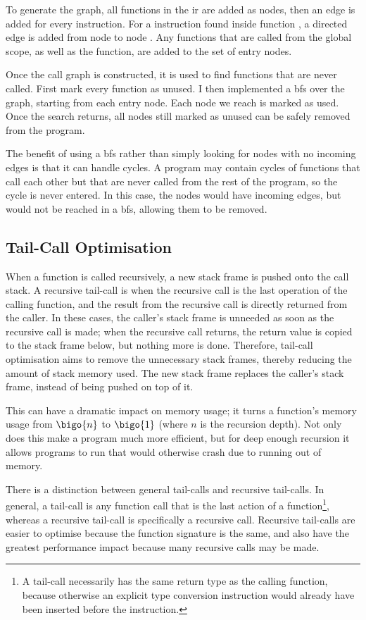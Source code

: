 \documentclass[00-main.tex]{subfiles}
\begin{document}
To generate the graph, all functions in the \gls{ir} are added as nodes, then an edge is added for every  instruction.
For a  instruction found inside function , a directed edge is added from node  to node .
Any functions that are called from the global scope, as well as the  function, are added to the set of entry nodes.

Once the call graph is constructed, it is used to find functions that are never called.
First mark every function as unused.
I then implemented a \gls{bfs} over the graph, starting from each entry node.
Each node we reach is marked as used.
Once the search returns, all nodes still marked as unused can be safely removed from the program.

The benefit of using a \gls{bfs} rather than simply looking for nodes with no incoming edges is that it can handle cycles.
A program may contain cycles of functions that call each other but that are never called from the rest of the program, so the cycle is never entered.
In this case, the nodes would have incoming edges, but would not be reached in a \gls{bfs}, allowing them to be removed.


\subsection{Tail-Call Optimisation}

When a function is called recursively, a new stack frame is pushed onto the call stack.
A recursive tail-call is when the recursive call is the last operation of the calling function, and the result from the recursive call is directly returned from the caller.
In these cases, the caller's stack frame is unneeded as soon as the recursive call is made; when the recursive call returns, the return value is copied to the stack frame below, but nothing more is done.
Therefore, tail-call optimisation aims to remove the unnecessary stack frames, thereby reducing the amount of stack memory used.
The new stack frame replaces the caller's stack frame, instead of being pushed on top of it.

This can have a dramatic impact on memory usage; it turns a function's memory usage from $\bigo{n}$ to $\bigo{1}$ (where $n$ is the recursion depth).
Not only does this make a program much more efficient, but for deep enough recursion it allows programs to run that would otherwise crash due to running out of memory.

There is a distinction between general tail-calls and recursive tail-calls. In general, a tail-call is any function call that is the last action of a function\footnote{A tail-call necessarily has the same return type as the calling function, because otherwise an explicit type conversion instruction would already have been inserted before the  instruction.}, whereas a recursive tail-call is specifically a recursive call.
Recursive tail-calls are easier to optimise because the function signature is the same, and also have the greatest performance impact because many recursive calls may be made.
\end{document}
